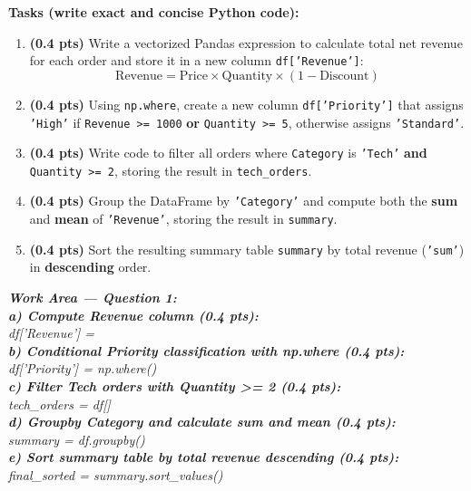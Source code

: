 \documentclass[11pt,a4paper]{article}
\newcommand{\answerbox}[2]{
  \vspace{1mm}
  \begin{tcolorbox}[
    colback=white,
    colframe=gray!60,
    boxrule=0.6pt,
    arc=2pt,
    height=#1,
    left=3mm, right=3mm, top=2mm, bottom=2mm
  ]
  \small\textit{\color{gray}#2}
  \end{tcolorbox}
  \vspace{1mm}
}
\begin{document}
\noindent
\textbf{Tasks (write exact and concise Python code):}
\begin{enumerate}[label=\textbf{\alph*)}]
  \item \textbf{(0.4 pts)} Write a vectorized Pandas expression to calculate total net revenue for each order and store it in a new column \texttt{df['Revenue']}:
  $$\text{Revenue} = \text{Price} \times \text{Quantity} \times (1 - \text{Discount})$$
  \item \textbf{(0.4 pts)} Using \texttt{np.where}, create a new column \texttt{df['Priority']} that assigns \texttt{'High'} if \texttt{Revenue >= 1000} \textbf{or} \texttt{Quantity >= 5}, otherwise assigns \texttt{'Standard'}.
  \item \textbf{(0.4 pts)} Write code to filter all orders where \texttt{Category} is \texttt{'Tech'} \textbf{and} \texttt{Quantity >= 2}, storing the result in \texttt{tech\_orders}.
  \item \textbf{(0.4 pts)} Group the DataFrame by \texttt{'Category'} and compute both the \textbf{sum} and \textbf{mean} of \texttt{'Revenue'}, storing the result in \texttt{summary}.
  \item \textbf{(0.4 pts)} Sort the resulting summary table \texttt{summary} by total revenue (\texttt{'sum'}) in \textbf{descending} order.
\end{enumerate}

\answerbox{7.2cm}{
\textbf{Work Area --- Question 1:}\\[2mm]
\textbf{a) Compute Revenue column (0.4 pts):}\\
df['Revenue'] = \dotfill\\[4.5mm]
\textbf{b) Conditional Priority classification with np.where (0.4 pts):}\\
df['Priority'] = np.where(\dotfill)\\[4.5mm]
\textbf{c) Filter Tech orders with Quantity >= 2 (0.4 pts):}\\
tech\_orders = df[\dotfill]\\[4.5mm]
\textbf{d) Groupby Category and calculate sum and mean (0.4 pts):}\\
summary = df.groupby(\dotfill)\\[4.5mm]
\textbf{e) Sort summary table by total revenue descending (0.4 pts):}\\
final\_sorted = summary.sort\_values(\dotfill)
}

\newpage
\end{document}
